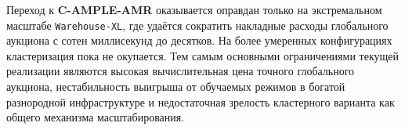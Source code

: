 Переход к \textbf{C-AMPLE-AMR} оказывается оправдан только на экстремальном масштабе \texttt{Warehouse-XL}, где удаётся сократить накладные расходы глобального аукциона с сотен миллисекунд до десятков. На более умеренных конфигурациях кластеризация пока не окупается. Тем самым основными ограничениями текущей реализации являются высокая вычислительная цена точного глобального аукциона, нестабильность выигрыша от обучаемых режимов в богатой разнородной инфраструктуре и недостаточная зрелость кластерного варианта как общего механизма масштабирования.
